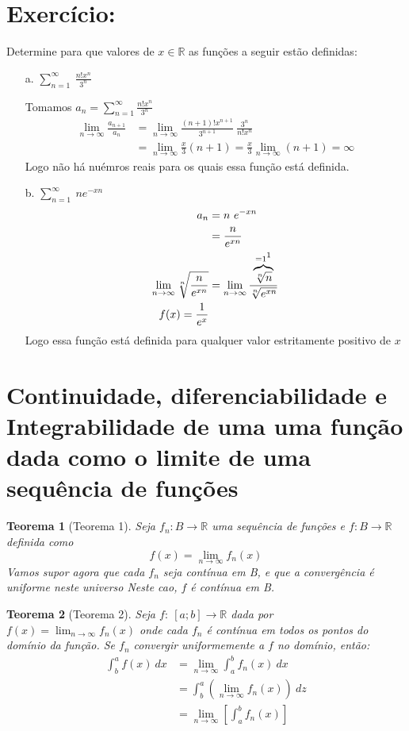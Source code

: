 \documentclass[12pt,openany, letterpaper]{book}
\newtheorem{theorem}{Teorema}[section]
\newcommand{\LI}[1][n]{\lim_{{#1} \rightarrow \infty}}
\newcommand{\soma}[2][n]{\sum_{{#1} = #2}^\infty}
\begin{document}
\section*{Exercício:} Determine para que valores de $x \in \mathds{R}$ as funções a seguir estão definidas:
\begin{itemize}
\item [a.] $\displaystyle{\soma{1} \ \frac{n! x^n}{3^n}}$

Tomamos $a_n = \soma{1} \frac{n! x^n}{3^n}$ 
\begin{align*}
\LI \frac{a_{n+1}}{a_n} &= \LI \frac{(n+1)! x^{n+1}}{3^{n+1}}\ \frac{3^n}{n! x^n} \\
&= \LI \frac{x}{3} (n+1) = \frac{x}{3} \LI (n+1) = \infty
\end{align*}
Logo não há nuémros reais para os quais essa função está definida.
\item [b.] $\displaystyle{\soma{1} \ ne^{-xn}}$
\begin{align*}
a_n &= n \ e^{-xn} \\
&= \frac{n}{e^{xn}} \\
\LI \sqrt[n]{\frac{n}{e^{xn}}} &= \LI \frac{\overbrace{\sqrt[n]{n}}^{=1 \footnote{\ref{subsec:ex223}}}}{\sqrt[n]{e^{xn}}} \\
f(x) = \frac{1}{e^x}
\end{align*}
Logo essa função está definida para qualquer valor estritamente positivo de $x$
\end{itemize}

\section{Continuidade, diferenciabilidade e Integrabilidade de uma uma função dada como o limite de uma sequência de funções}

\begin{theorem}[Teorema 1\label{t:3-1}] 
Seja $f_n: B \rightarrow \mathds{R}$ uma sequência de funções e $f: B \rightarrow \mathds{R}$ definida como  $$f(x) = \LI f_n(x)$$ \hspace{5mm}Vamos supor agora que cada $f_n$ seja contínua em B, e que a convergência é uniforme neste universo  Neste cao, $f$ é contínua em B.
\end{theorem}

\begin{theorem}[Teorema 2\label{t:3-2}] 
Seja $f: \ [a;b] \rightarrow \mathds{R}$ dada por $f(x) = \LI f_n (x)$ onde cada $f_n$ é contínua em todos os pontos do domínio da função. Se $f_n$ convergir uniformemente a $f$ no domínio, então: \begin{align*}
\int_b^a f(x) \ dx &= \LI \int_a^b f_n(x) \ dx \\
&= \int_b^a \left( \LI f_n(x) \right) \ dz  \\ 
&= \LI \left[\int_a^b f_n (x) \right] \\
\end{align*}
\end{theorem}
\end{document}
